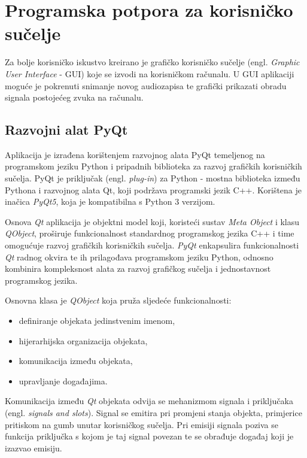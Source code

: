 \chapter{Programska potpora za korisničko sučelje}

Za bolje korisničko iskustvo kreirano je grafičko korisničko sučelje (engl. \textit{Graphic User Interface} - GUI) koje se izvodi na korisničkom računalu. U GUI aplikaciji moguće je pokrenuti snimanje novog audiozapisa te grafički prikazati obradu signala postojećeg zvuka na računalu. 

\section{Razvojni alat PyQt} 
Aplikacija je izrađena korištenjem razvojnog alata PyQt temeljenog na programskom
jeziku Python i pripadnih biblioteka za razvoj grafičkih korisničkih sučelja. PyQt je priključak (engl. \textit{plug-in}) za Python - mostna biblioteka između Pythona i razvojnog alata Qt, koji podržava programski jezik C++. Korištena je inačica \textit{PyQt5}, koja je kompatibilna s Python 3 verzijom.

Osnova \textit{Qt} aplikacija je objektni model koji, koristeći sustav \textit{Meta Object} i klasu \textit{QObject}, proširuje funkcionalnost standardnog programskog jezika C++ i time omogućuje razvoj grafičkih korisničkih sučelja. \textit{PyQt} enkapsulira funkcionalnosti \textit{Qt} radnog okvira te ih prilagođava programskom jeziku Python, odnosno kombinira kompleksnost alata za razvoj grafičkog sučelja i jednostavnost programskog jezika.

Osnovna klasa je \textit{QObject} koja pruža sljedeće funkcionalnosti:
\begin{itemize}
	\item definiranje objekata jedinstvenim imenom,
	\item hijerarhijska organizacija objekata,
	\item komunikacija između objekata, 
	\item upravljanje događajima.
\end{itemize}

Komunikacija između \textit{Qt} objekata odvija se mehanizmom signala i priključaka (engl. \textit{signals and slots}). Signal se emitira pri promjeni stanja objekta, primjerice pritiskom na gumb unutar korisničkog sučelja. Pri emisiji signala poziva se funkcija priključka s kojom je taj signal povezan te se obrađuje događaj koji je izazvao emisiju. 


